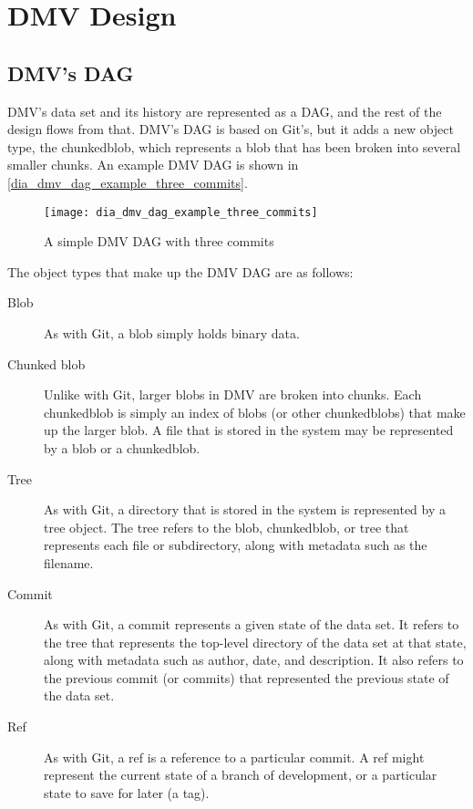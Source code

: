 \chapter{DMV Design}


\section{DMV's DAG}

DMV's data set and its history are represented as a DAG, and the rest of the
design flows from that. DMV's DAG is based on Git's, but it adds a new object
type, the \gls{chunkedblob}, which represents a \gls{blob} that has been broken
into several smaller chunks. An example DMV DAG is shown in
\autoref{dia_dmv_dag_example_three_commits}.

\begin{figure}[]
    \centering
    \texttt{[image: dia\_dmv\_dag\_example\_three\_commits]}
    \caption{A simple DMV DAG with three commits}
    \label{dia_dmv_dag_example_three_commits}
\end{figure}

The object types that make up the DMV DAG are as follows:

\begin{description}

    \item[Blob] As with Git, a \gls{blob} simply holds binary data.

    \item[Chunked blob] Unlike with Git, larger \glspl{blob} in DMV are
        broken into chunks. Each \gls{chunkedblob} is simply an index of
        \glspl{blob} (or other \glspl{chunkedblob}) that make up the larger
        \gls{blob}. A file that is stored in the system may be represented by a
        \gls{blob} or a \gls{chunkedblob}.

    \item[Tree] As with Git, a directory that is stored in the system is
        represented by a tree object. The tree refers to the \gls{blob},
        \gls{chunkedblob}, or tree that represents each file or subdirectory,
        along with metadata such as the filename.

    \item[Commit] As with Git, a commit represents a given state of the data
        set. It refers to the tree that represents the top-level directory of
        the data set at that state, along with metadata such as author, date,
        and description. It also refers to the previous commit (or commits) that
        represented the previous state of the data set.

    \item[Ref] As with Git, a ref is a reference to a particular commit. A ref
        might represent the current state of a branch of development, or a
        particular state to save for later (a tag).

\end{description}

